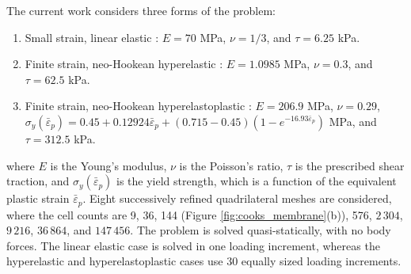 \documentclass[sn-mathphys,Numbered]{sn-jnl}%
\begin{document}
The current work considers three forms of the problem:
\begin{enumerate}[label=\roman*.]
	\item Small strain, linear elastic \cite{Zienkiewicz2000, Simplas}: $E=70$ MPa, $\nu=1/3$, and $\tau = 6.25$ kPa.
	\item Finite strain, neo-Hookean hyperelastic \cite{Pelteret2018}: $E=1.0985$ MPa, $\nu=0.3$, and $\tau = 62.5$ kPa.
	\item Finite strain, neo-Hookean hyperelastoplastic \citep{Simo1992, Simplas, Cesar2001}: $E=206.9$ MPa, $\nu=0.29$, $\sigma_y(\bar{\varepsilon}_p) = 0.45 + 0.12924\bar{\varepsilon}_p + (0.715 - 0.45)(1- e^{-16.93\bar{\varepsilon}_p})$ MPa, and $\tau = 312.5$ kPa.
\end{enumerate}
where $E$ is the Young's modulus, $\nu$ is the Poisson's ratio, $\tau$ is the prescribed shear traction, and $\sigma_y(\bar{\varepsilon}_p)$ is the yield strength, which is a function of the equivalent plastic strain $\bar{\varepsilon}_p$.
Eight successively refined quadrilateral meshes are considered, where the cell counts are 9, 36, 144 (Figure \ref{fig:cooks_membrane}(b)), 576, $2\,304$, $9\,216$, $36\,864$, and $147\,456$.
The problem is solved quasi-statically, with no body forces.
The linear elastic case is solved in one loading increment, whereas the hyperelastic and hyperelastoplastic cases use 30 equally sized loading increments.
\end{document}
